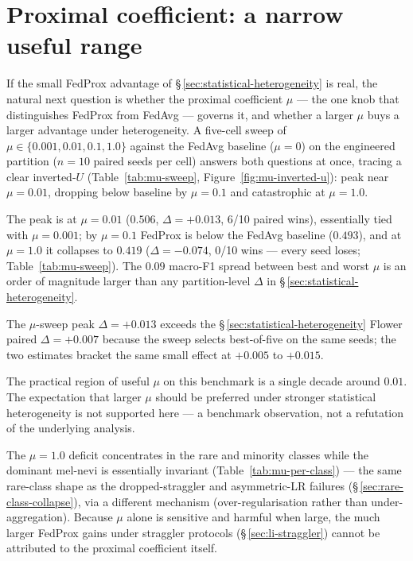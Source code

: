 \documentclass[11pt,a4paper]{report}
\begin{document}


\section{Proximal coefficient: a narrow useful range}
\label{sec:mu-sensitivity}

If the small FedProx advantage of \S\,\ref{sec:statistical-heterogeneity} is
real, the natural next question is whether the proximal coefficient $\mu$ ---
the one knob that distinguishes FedProx from FedAvg --- governs it, and whether
a larger $\mu$ buys a larger advantage under heterogeneity. A five-cell sweep
of $\mu \in \{0.001, 0.01, 0.1, 1.0\}$ against the FedAvg
baseline ($\mu = 0$) on the engineered partition ($n=10$ paired seeds per
cell) answers both questions at once, tracing a clear inverted-$U$
(Table~\ref{tab:mu-sweep},
Figure~\ref{fig:mu-inverted-u}): peak near $\mu = 0.01$, dropping below
baseline by $\mu = 0.1$ and catastrophic at $\mu = 1.0$.

The peak is at $\mu = 0.01$ ($0.506$, $\Delta = +0.013$, 6/10 paired wins),
essentially tied with $\mu = 0.001$; by $\mu = 0.1$ FedProx is below the FedAvg
baseline ($0.493$), and at $\mu = 1.0$ it collapses to $0.419$
($\Delta = -0.074$, 0/10 wins --- every seed loses; Table~\ref{tab:mu-sweep}).
The $0.09$ macro-F1 spread between best and worst $\mu$ is an order of magnitude
larger than any partition-level $\Delta$ in
\S\,\ref{sec:statistical-heterogeneity}.

The $\mu$-sweep peak $\Delta = +0.013$ exceeds the
\S\,\ref{sec:statistical-heterogeneity} Flower paired $\Delta = +0.007$
because the sweep selects best-of-five on the same seeds; the two estimates
bracket the same small effect at $+0.005$ to $+0.015$.

The practical region of useful $\mu$ on this benchmark is a single decade
around $0.01$. The expectation that larger $\mu$ should be preferred under
stronger statistical heterogeneity is not supported here --- a benchmark
observation, not a refutation of the underlying analysis.

The $\mu = 1.0$ deficit concentrates in the rare and minority classes while the
dominant mel-nevi is essentially invariant (Table~\ref{tab:mu-per-class}) --- the
same rare-class shape as the dropped-straggler and asymmetric-LR failures
(\S\,\ref{sec:rare-class-collapse}), via a different mechanism
(over-regularisation rather than under-aggregation). Because $\mu$ alone is
sensitive and harmful when large, the much larger FedProx gains under straggler
protocols (\S\,\ref{sec:li-straggler}) cannot be attributed to the proximal
coefficient itself.
\end{document}

